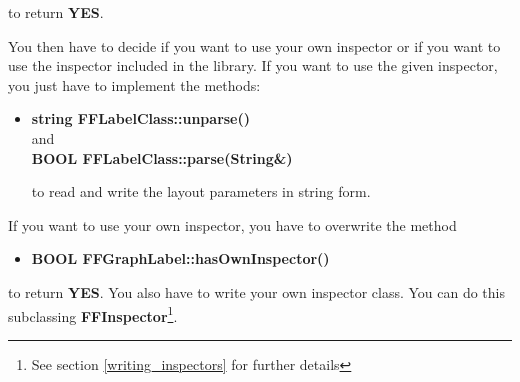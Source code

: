 to return {\bf YES}.  

You then have to decide if you want to use your own inspector or
if you want to use the inspector included in the library.  If you
want to use the given inspector, you just have to implement the
methods:

\begin{itemize}

\item {\bf string FFLabelClass::unparse()}\\
  and \\
  {\bf BOOL FFLabelClass::parse(String\&)}

to read and write the layout parameters in string form.  
 
\end{itemize}

If you want to use your own inspector, you have to overwrite
the method 

\begin{itemize}
\item{\bf BOOL FFGraphLabel::hasOwnInspector()}
\end{itemize}

to return {\bf YES}. You also have to write your own inspector
class. You can do this  subclassing {\bf FFInspector}\footnote{See
section \vref{writing_inspectors} for further details}.
